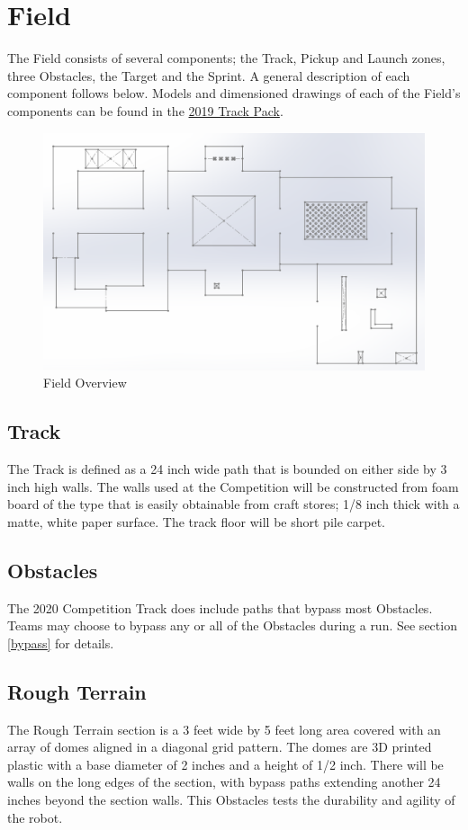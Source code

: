 \section{Field}
The Field consists of several components; the Track, Pickup and Launch zones, three Obstacles, the Target and the Sprint. A general description of each component follows below. Models and dimensioned drawings of each of the Field’s components can be found in the {\col\href{https://mercury.okstate.edu/content/mercury-challenge}{2019 Track Pack}}.

\begin{figure}[H]
	\centering
	\includegraphics[width=.85\textwidth]{images/track_overview_wlabels.png}
	\caption{Field Overview}
	\label{fig:field} 
\end{figure}

\subsection{Track}
The Track is defined as a 24 inch wide path that is bounded on either side by 3 inch high walls. The walls used at the Competition will be constructed from foam board of the type that is easily obtainable from craft stores; 1/8 inch thick with a matte, white paper surface. The track floor will be short pile carpet.

\subsection{Obstacles}
The 2020 Competition Track does include paths that bypass most Obstacles. Teams may choose to bypass any or all of the Obstacles during a run. See section \ref{bypass} for details.

\subsection{Rough Terrain}
The Rough Terrain section is a 3 feet wide by 5 feet long area covered with an array of domes aligned in a diagonal grid pattern. The domes are 3D printed plastic with a base diameter of 2 inches and a height of 1/2 inch. There will be walls on the long edges of the section, with bypass paths extending another 24 inches beyond the section walls. This Obstacles tests the durability and agility of the robot.

